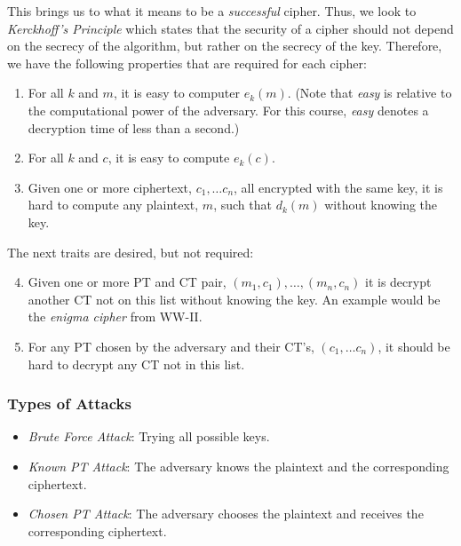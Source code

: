 This brings us to what it means to be a \textit{successful} cipher. Thus, we look to \textit{Kerckhoff's Principle} which states that the security of a cipher should not depend on the secrecy of the algorithm, but rather on the secrecy of the key. Therefore, we have the following properties that are required for each cipher:
\begin{enumerate}[label=\arabic*.]
    \item For all \(k\) and \(m\), it is easy to computer \(e_k(m)\). (Note that \textit{easy} is relative to the computational power of the adversary. For this course, \textit{easy} denotes a decryption time of less than a second.)
    \item For all \(k\) and \(c\), it is easy to compute \(e_k(c)\).
    \item Given one or more ciphertext, \(c_1,\dots c_n\), all encrypted with the same key, it is hard to compute any plaintext, \(m\), such that \(d_k(m)\) without knowing the key.
\end{enumerate}

The next traits are desired, but not required:

\begin{enumerate}[label=\arabic*.]
    \setcounter{enumi}{3}
    \item Given one or more PT and CT pair, \((m_1,c_1),\dots,(m_n,c_n)\) it is decrypt another CT not on this list without knowing the key. An example would be the \textit{enigma cipher} from WW-II\@.
    \item For any PT chosen by the adversary and their CT's, \((c_1,\dots c_n)\), it should be hard to decrypt any CT not in this list.
\end{enumerate}

\begin{center}
    \subsubsection{Types of Attacks}
\end{center}

\begin{itemize}
    \item \textit{Brute Force Attack}: Trying all possible keys.
    \item \textit{Known PT Attack}: The adversary knows the plaintext and the corresponding ciphertext.
    \item \textit{Chosen PT Attack}: The adversary chooses the plaintext and receives the corresponding ciphertext.
\end{itemize}

